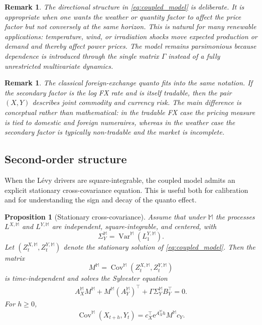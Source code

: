 \documentclass[10pt,a4paper,reqno]{amsart}
\newtheorem{proposition}[theorem]{Proposition}
\newtheorem{remark}[theorem]{Remark}
\newcommand{\1}{\mathbbm{1}}
\newcommand{\ee}{\mathrm{e}}
\DeclareMathOperator{\Cov}{Cov}
\DeclareMathOperator{\Var}{Var}
\begin{document}
\begin{remark}
The directional structure in \eqref{eq:coupled_model} is deliberate. It is
appropriate when one wants the weather or quantity factor to affect the price
factor but not conversely at the same horizon. This is natural for many
renewable applications: temperature, wind, or irradiation shocks move expected
production or demand and thereby affect power prices. The model remains
parsimonious because dependence is introduced through the single matrix
$\Gamma$ instead of a fully unrestricted multivariate dynamics.
\end{remark}

\begin{remark}
The classical foreign-exchange quanto fits into the same notation. If the
secondary factor is the log FX rate and is itself tradable, then the pair
$(X,Y)$ describes joint commodity and currency risk. The main difference is
conceptual rather than mathematical: in the tradable FX case the pricing measure
is tied to domestic and foreign numeraires, whereas in the weather case the
secondary factor is typically non-tradable and the market is incomplete.
\end{remark}

\subsection{Second-order structure}

When the Lévy drivers are square-integrable, the coupled model admits an
explicit stationary cross-covariance equation. This is useful both for
calibration and for understanding the sign and decay of the quanto effect.

\begin{proposition}[Stationary cross-covariance]
\label{prop:cross_covariance}
Assume that under $\mathbb{M}$ the processes $L^{X,\mathbb{M}}$ and
$L^{Y,\mathbb{M}}$ are independent, square-integrable, and centered, with
$$
\Sigma_Y^{\mathbb{M}} = \Var^{\mathbb{M}}(L_1^{Y,\mathbb{M}}).
$$
Let $(Z_t^{X,\mathbb{M}},Z_t^{Y,\mathbb{M}})$ denote the stationary solution
of \eqref{eq:coupled_model}. Then the matrix
$$
M^{\mathbb{M}} = \Cov^{\mathbb{M}}(Z_t^{X,\mathbb{M}}, Z_t^{Y,\mathbb{M}})
$$
is time-independent and solves the Sylvester equation
\begin{align}\label{eq:sylvester_cross_cov}
  A_X^{\mathbb{M}} M^{\mathbb{M}}
  + M^{\mathbb{M}} (A_Y^{\mathbb{M}})^\top
  + \Gamma \Sigma_Y^{\mathbb{M}} B_Y^\top
  = 0.
\end{align}
For $h \ge 0$,
\begin{align}\label{eq:lagged_cross_cov}
  \Cov^{\mathbb{M}}(X_{t+h},Y_t)
  = c_X^\top
      \ee^{A_X^{\mathbb{M}} h}
      M^{\mathbb{M}}
      c_Y.
\end{align}
\end{proposition}
\end{document}
